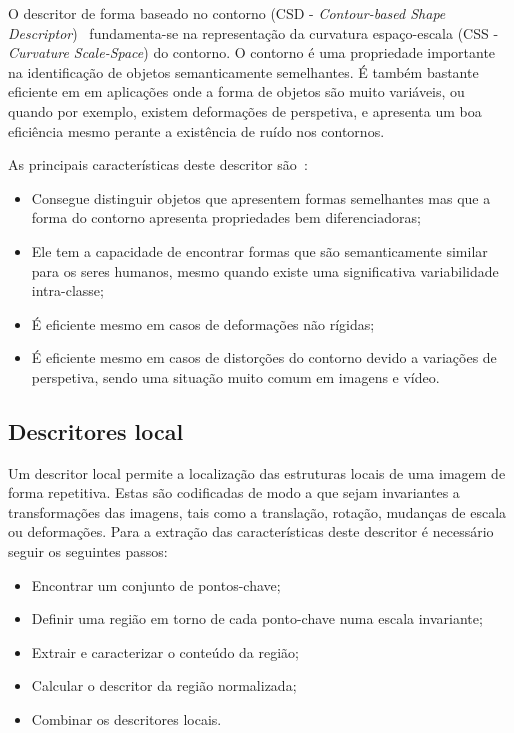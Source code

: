 O descritor de forma baseado no contorno (CSD - \textit{Contour-based Shape Descriptor})~\cite{Bober2001} fundamenta-se na representação da curvatura espaço-escala (CSS - \textit{Curvature Scale-Space}) do contorno. O contorno é uma propriedade importante na identificação de objetos semanticamente semelhantes. É também bastante eficiente em em aplicações onde a forma de objetos são muito variáveis, ou quando por exemplo, existem deformações de perspetiva, e apresenta um boa eficiência mesmo perante a existência de ruído nos contornos. 

As principais características deste descritor são~\cite{Bober2001}: 

\begin{itemize}
\item Consegue distinguir objetos que apresentem formas semelhantes mas que a forma do contorno apresenta propriedades bem diferenciadoras;
\item Ele tem a capacidade de encontrar formas que são semanticamente similar para os seres humanos, mesmo quando existe uma significativa variabilidade intra-classe;
\item É eficiente mesmo em casos de deformações não rígidas;
\item É eficiente mesmo em casos de distorções do contorno devido a variações de perspetiva, sendo uma situação muito comum em imagens e vídeo.
\end{itemize}

\subsection{Descritores local}

Um descritor local permite a localização das estruturas locais de uma imagem de forma repetitiva. Estas são codificadas de modo a que sejam invariantes a transformações das imagens, tais como a translação, rotação, mudanças de escala ou deformações. Para a extração das características deste descritor é necessário seguir os seguintes passos:

\begin{itemize}
\item Encontrar um conjunto de pontos-chave;
\item Definir uma região em torno de cada ponto-chave numa escala invariante;
\item Extrair e caracterizar o conteúdo da região;
\item Calcular o descritor da região normalizada;
\item Combinar os descritores locais.
\end{itemize}

